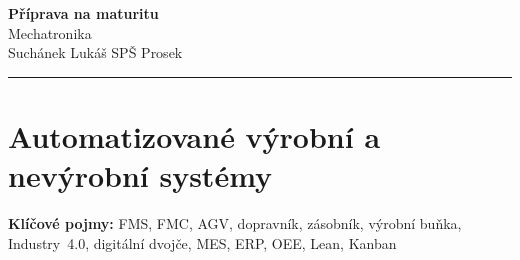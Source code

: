 \documentclass[a4paper,10pt]{article}
\begin{document}
\begin{minipage}[t]{0.75\textwidth}
    {\Huge\bfseries\color{accent} Příprava na maturitu}\\[4pt]
    {\large\color{stripeblue} Mechatronika}\\[2pt]
    \textcolor{medgray}{\small Suchánek Lukáš \quad SPŠ Prosek }
\end{minipage}
\hfill
\begin{minipage}[t]{0.22\textwidth}
    \raggedleft
\end{minipage}

\vspace{6pt}
\noindent\color{accent}\rule{\linewidth}{1.5pt}
\vspace{2pt}

\section{Automatizované výrobní a nevýrobní systémy}

\begin{pojmybox}
\textbf{Klíčové pojmy:}
FMS, FMC, AGV, dopravník, zásobník, výrobní buňka,
Industry~4.0, digitální dvojče, MES, ERP, OEE, Lean, Kanban
\end{pojmybox}
\end{document}
